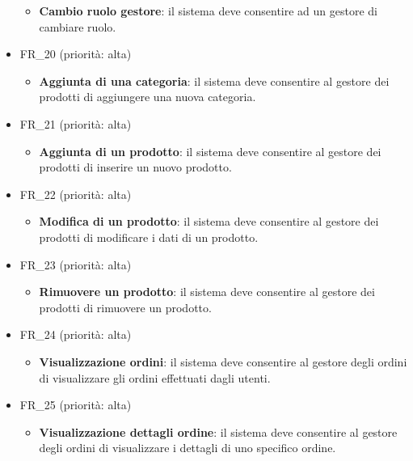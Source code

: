 \documentclass[12pt, a4paper, oneside]{book}
\begin{document}
\begin{itemize}
\begin{itemize}
                   \item \textbf{Cambio ruolo gestore}: il sistema deve consentire ad un gestore di cambiare ruolo.
                \end{itemize}
                \newpage
            \item FR\_20 (priorità: alta)
               \begin{itemize}
                   \item \textbf{Aggiunta di una categoria}: il sistema deve consentire al gestore dei prodotti di aggiungere una nuova categoria.
                \end{itemize}
            \item FR\_21 (priorità: alta)
               \begin{itemize}
                   \item \textbf{Aggiunta di un prodotto}: il sistema deve consentire al gestore dei prodotti di inserire un nuovo prodotto.
                \end{itemize}
            \item FR\_22 (priorità: alta)
               \begin{itemize}
                   \item \textbf{Modifica di un prodotto}: il sistema deve consentire al gestore dei prodotti di modificare i dati di un prodotto.
                \end{itemize}
            \item FR\_23 (priorità: alta)
               \begin{itemize}
                   \item \textbf{Rimuovere un prodotto}: il sistema deve consentire al gestore dei prodotti di rimuovere un prodotto.
                \end{itemize}
            \item FR\_24 (priorità: alta)
               \begin{itemize}
                   \item \textbf{Visualizzazione ordini}: il sistema deve consentire al gestore degli ordini di visualizzare gli ordini effettuati dagli utenti.
                \end{itemize}
            \item FR\_25 (priorità: alta)
               \begin{itemize}
                   \item \textbf{Visualizzazione dettagli ordine}: il sistema deve consentire al gestore degli ordini di visualizzare i dettagli di uno specifico ordine.

\end{itemize}
\end{itemize}
\end{document}
